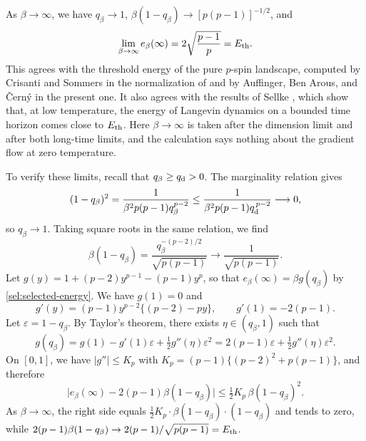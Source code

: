 \begin{remark}\label{rem:low-temperature}
As $\beta\to\infty$, we have $q_\beta\to1$, $\beta(1-q_\beta)\to[p(p-1)]^{-1/2}$, and
\[
 \lim_{\beta\to\infty}e_\beta(\infty)=2\sqrt{\frac{p-1}{p}}=E_{\mathrm{th}}.
\]
This agrees with the threshold energy of the pure $p$-spin landscape, computed by Crisanti and Sommers \cite[Equation~(9)]{cs1995} in the normalization of \cite{ck1993} and by Auffinger, Ben Arous, and \v{C}ern\'y \cite[Equation~(2.13)]{abc2013} in the present one. It also agrees with the results of Sellke \cite[Theorems~1.1 and~1.7]{sellke2024}, which show that, at low temperature, the energy of Langevin dynamics on a bounded time horizon comes close to $E_{\mathrm{th}}$. Here $\beta\to\infty$ is taken after the dimension limit and after both long-time limits, and the calculation says nothing about the gradient flow at zero temperature.

To verify these limits, recall that $q_\beta\ge q_{\mathrm d}>0$. The marginality relation gives
\[
 (1-q_\beta)^2=\frac1{\beta^2p(p-1)q_\beta^{p-2}}\le\frac1{\beta^2p(p-1)q_{\mathrm d}^{\,p-2}}\longrightarrow0,
\]
so $q_\beta\to1$. Taking square roots in the same relation, we find
\[
 \beta(1-q_\beta)=\frac{q_\beta^{-(p-2)/2}}{\sqrt{p(p-1)}}\longrightarrow\frac1{\sqrt{p(p-1)}}.
\]
Let $g(y)=1+(p-2)y^{p-1}-(p-1)y^p$, so that $e_\beta(\infty)=\beta g(q_\beta)$ by \eqref{sel:selected-energy}. We have $g(1)=0$ and
\[
 g'(y)=(p-1)y^{p-2}\bigl\{(p-2)-py\bigr\},\qquad g'(1)=-2(p-1).
\]
Let $\varepsilon=1-q_\beta$. By Taylor's theorem, there exists $\eta\in(q_\beta,1)$ such that
\[
 g(q_\beta)=g(1)-g'(1)\varepsilon+\tfrac12g''(\eta)\varepsilon^2
 =2(p-1)\varepsilon+\tfrac12g''(\eta)\varepsilon^2.
\]
On $[0,1]$, we have $|g''|\le K_p$ with $K_p=(p-1)\{(p-2)^2+p(p-1)\}$, and therefore
\[
 \bigl|e_\beta(\infty)-2(p-1)\beta(1-q_\beta)\bigr|\le\tfrac12K_p\,\beta(1-q_\beta)^2.
\]
As $\beta\to\infty$, the right side equals $\frac12K_p\cdot\beta(1-q_\beta)\cdot(1-q_\beta)$ and tends to zero, while $2(p-1)\beta(1-q_\beta)\to2(p-1)/\sqrt{p(p-1)}=E_{\mathrm{th}}$.
\end{remark}

